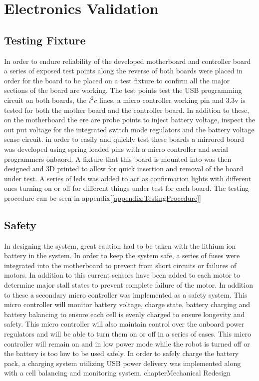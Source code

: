 \documentclass[12pt]{report}
\begin{document}
\section{Electronics Validation}

\subsection{Testing Fixture}
In order to endure reliability of the developed motherboard and controller board a series of exposed test points along the reverse of both boards were placed in order for the board to be placed on a test fixture to confirm all the major sections of the board are working. The test points test the USB programming circuit on both boards, the $i^2c$ lines, a micro controller working pin and 3.3v is tested for both the mother board and the controller board. In addition to these, on the motherboard the ere are probe points to inject battery voltage, inspect the out put voltage for the integrated switch mode regulators and the battery voltage sense circuit. in order to easily and quickly test these boards a mirrored board was developed using spring loaded pins with a micro controller and serial programmers onbaord. A fixture that this board is mounted into was then designed and 3D printed to allow for quick insertion and removal of the board under test. A series of leds was added to act as confirmation lights with different ones turning on or off for different things under test for each board. The testing procedure can be seen in appendix[\ref{appendix:TestingProcedure}]

\subsection{Safety}
    In designing the system, great caution had to be taken with the lithium ion battery in the system. In order to keep the system safe, a series of fuses were integrated into the motherboard to prevent from short circuits or failures of motors. In addition to this current sensors have been added to each motor to determine major stall states to prevent complete failure of the motor. In addition to these a secondary micro controller was implemented as a safety system. This micro controller will monitor battery voltage, charge state, battery charging and battery balancing to ensure each cell is evenly charged to ensure longevity and safety. This micro controller will also  maintain control over the onboard power regulators and will be able to turn them on or off in a series of cases. This micro controller will remain on and in low power mode while the robot is turned off or the battery is too low to be used safely. In order to safely charge the battery pack, a charging system utilizing USB power delivery was implemented along with a cell balancing and monitoring system. chapter{Mechanical Redesign}
\end{document}
